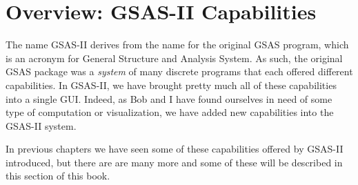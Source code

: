 \chapter{Overview: GSAS-II Capabilities}
The name GSAS-II derives from the name for the original GSAS program, which is an acronym for General Structure and Analysis System. As such, the original GSAS package was a \textit{system} of many discrete programs that each offered different capabilities. In GSAS-II, we have brought pretty much all of these capabilities into a single GUI. Indeed, as Bob and I have found ourselves in need of some type of computation or visualization, we have added new capabilities into the GSAS-II system. 

In previous chapters we have seen some of these capabilities offered by GSAS-II introduced, but there are are many more and some of these will be described in this section of this book. 
